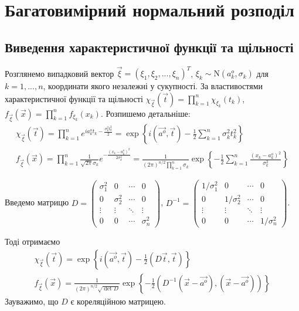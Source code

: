 
\section{Багатовимірний нормальний розподіл}
\subsection{Виведення характеристичної функції та щільності}

Розглянемо випадковий вектор $\vec{\xi} = (\xi_1, \xi_2, ..., \xi_n)^T$, $\xi_k \sim \mathrm{N}(a_k^o, \sigma_k)$ для $k=1,...,n$, координати якого незалежні у сукупності.
За властивостями характеристичної функції та щільності $\chi_{\vec{\xi}}(\vec{t}) = \prod\limits_{k=1}^n \chi_{\xi_k}(t_k)$,
$f_{\vec{\xi}}(\vec{x}) = \prod\limits_{k=1}^n f_{\xi_k}(x_k)$. Розпишемо детальніше:
\begin{gather*}
    \chi_{\vec{\xi}}(\vec{t}) = \prod\limits_{k=1}^n e^{i a_k^o t_k - \frac{\sigma_k^2 t_k^2}{2}} = \exp\left\{i(\vec{a^o}, \vec{t}) - \frac{1}{2}\sum\limits_{k=1}^n \sigma_k^2 t_k^2\right\}
    \\
    f_{\vec{\xi}}(\vec{x}) = \prod\limits_{k=1}^n \frac{1}{\sqrt{2\pi}\sigma_k} e^{-\frac{(x_k-a_k^o)^2}{2\sigma_k^2}} = \frac{1}{(2\pi)^{n/2}\prod_{k=1}^n \sigma_k} \exp \left\{ -\frac{1}{2} \sum_{k=1}^n \frac{(x_k-a_k^o)^2}{\sigma_k^2}\right\}
\end{gather*}

Введемо матрицю $D = \begin{pmatrix}
    \sigma_1^2 & 0 & \cdots & 0 \\
    0 & \sigma_2^2 & \cdots & 0 \\
    \vdots & \vdots & \ddots & \vdots \\
    0 & 0 & \cdots & \sigma_n^2
\end{pmatrix}$, $D^{-1} = \begin{pmatrix}
    1/\sigma_1^2 & 0 & \cdots & 0 \\
    0 & 1/\sigma_2^2 & \cdots & 0 \\
    \vdots & \vdots & \ddots & \vdots \\
    0 & 0 & \cdots & 1/\sigma_n^2
\end{pmatrix}$.

\noindent Тоді отримаємо
\begin{gather}
    \chi_{\vec{\xi}}(\vec{t}) = \exp\left\{i(\vec{a^o}, \vec{t}) - \frac{1}{2}(D\vec{t}, \vec{t})\right\}
    \\
    f_{\vec{\xi}}(\vec{x}) = \frac{1}{(2\pi)^{n/2} \sqrt{{\det{D}}}} \exp \left\{ -\frac{1}{2} \left( D^{-1}(\vec{x} - \vec{a^o}), (\vec{x} - \vec{a^o})\right)\right\}
\end{gather}
Зауважимо, що $D$ є кореляційною матрицею.

